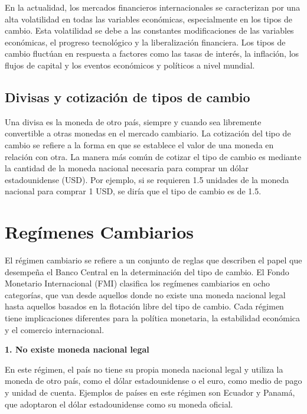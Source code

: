 \documentclass[
  a4paper,
]{article}
\begin{document}
En la actualidad, los mercados financieros internacionales se
caracterizan por una alta volatilidad en todas las variables económicas,
especialmente en los tipos de cambio. Esta volatilidad se debe a las
constantes modificaciones de las variables económicas, el progreso
tecnológico y la liberalización financiera. Los tipos de cambio fluctúan
en respuesta a factores como las tasas de interés, la inflación, los
flujos de capital y los eventos económicos y políticos a nivel mundial.

\hypertarget{divisas-y-cotizaciuxf3n-de-tipos-de-cambio}{%
\subsection{Divisas y cotización de tipos de
cambio}\label{divisas-y-cotizaciuxf3n-de-tipos-de-cambio}}

Una divisa es la moneda de otro país, siempre y cuando sea libremente
convertible a otras monedas en el mercado cambiario. La cotización del
tipo de cambio se refiere a la forma en que se establece el valor de una
moneda en relación con otra. La manera más común de cotizar el tipo de
cambio es mediante la cantidad de la moneda nacional necesaria para
comprar un dólar estadounidense (USD). Por ejemplo, si se requieren 1.5
unidades de la moneda nacional para comprar 1 USD, se diría que el tipo
de cambio es de 1.5.

\hypertarget{reguxedmenes-cambiarios}{%
\section{Regímenes Cambiarios}\label{reguxedmenes-cambiarios}}

El régimen cambiario se refiere a un conjunto de reglas que describen el
papel que desempeña el Banco Central en la determinación del tipo de
cambio. El Fondo Monetario Internacional (FMI) clasifica los regímenes
cambiarios en ocho categorías, que van desde aquellos donde no existe
una moneda nacional legal hasta aquellos basados en la flotación libre
del tipo de cambio. Cada régimen tiene implicaciones diferentes para la
política monetaria, la estabilidad económica y el comercio
internacional.

\textbf{1. No existe moneda nacional legal}

En este régimen, el país no tiene su propia moneda nacional legal y
utiliza la moneda de otro país, como el dólar estadounidense o el euro,
como medio de pago y unidad de cuenta. Ejemplos de países en este
régimen son Ecuador y Panamá, que adoptaron el dólar estadounidense como
su moneda oficial.
\end{document}
